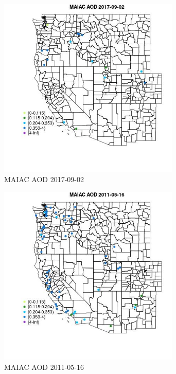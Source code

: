 \begin{figure} 
\centering  
\includegraphics[width=0.77\textwidth]{Code_Outputs/Report_ML_input_PM25_Step4_part_e_de_duplicated_aveswNAs_MapObsMAIAC_AOD2017-09-02.jpg} 
\caption{\label{fig:Report_ML_input_PM25_Step4_part_e_de_duplicated_aveswNAsMapObsMAIAC_AOD2017-09-02}MAIAC AOD 2017-09-02} 
\end{figure} 
 

\begin{figure} 
\centering  
\includegraphics[width=0.77\textwidth]{Code_Outputs/Report_ML_input_PM25_Step4_part_e_de_duplicated_aveswNAs_MapObsMAIAC_AOD2011-05-16.jpg} 
\caption{\label{fig:Report_ML_input_PM25_Step4_part_e_de_duplicated_aveswNAsMapObsMAIAC_AOD2011-05-16}MAIAC AOD 2011-05-16} 
\end{figure} 
 

